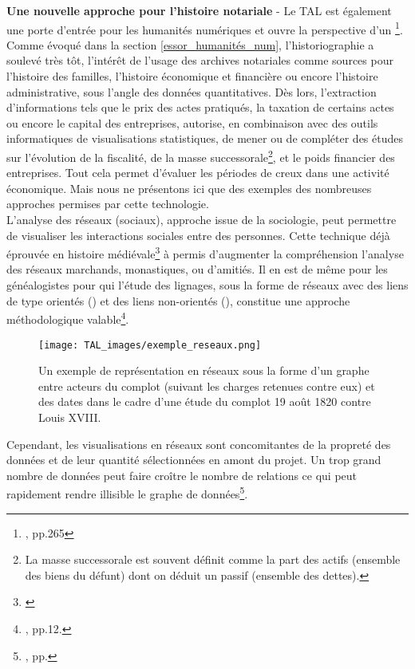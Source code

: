 \textbf{Une nouvelle approche pour l'histoire notariale} - Le TAL est également une porte d'entrée pour les humanités numériques et ouvre la perspective d'un \footnote{\cite{limon-bonnet_innovation_2019}, pp.265}. 
Comme évoqué dans la section \ref{essor_humanités_num}, l'historiographie a soulevé très tôt, l'intérêt de l'usage des archives notariales comme sources pour l'histoire des familles, l'histoire économique et financière ou encore l'histoire administrative, sous l'angle des données quantitatives.  
Dès lors, l'extraction d'informations tels que le prix des actes pratiqués, la taxation de certains actes ou encore le capital des entreprises, autorise, en combinaison avec des outils informatiques de visualisations statistiques, de mener ou de compléter des études sur l'évolution de la fiscalité, de la masse successorale\footnote{La masse successorale est souvent définit comme la part des actifs (ensemble des biens du défunt) dont on déduit un passif (ensemble des dettes).}, et le poids financier des entreprises. Tout cela permet d'évaluer les périodes de creux dans une activité économique. Mais nous ne présentons ici que des exemples des nombreuses approches permises par cette technologie.\\

L'analyse des réseaux (sociaux), approche issue de la sociologie, peut permettre de visualiser les interactions sociales entre des personnes. Cette technique déjà éprouvée en histoire médiévale\footnote{\cite{jegou_potentialites_nodate}} à permis d'augmenter la compréhension l'analyse des réseaux marchands, monastiques, ou d'amitiés. Il en est de même pour les généalogistes pour qui l'étude des lignages, sous la forme de réseaux avec des liens de type orientés () et des liens non-orientés (), constitue une approche méthodologique valable\footnote{\cite{beauguitte_analyse_2016}, pp.12.}.\\

\begin{figure}[h]
    \texttt{[image: TAL\_images/exemple\_reseaux.png]}
    \caption{Un exemple de représentation en réseaux sous la forme d'un graphe entre acteurs du complot (suivant les charges retenues contre eux) et des dates dans le cadre d'une étude du complot 19 août 1820 contre Louis XVIII. \textcopyright\cite{faraut_les_2015}}
    \label{fig:NER}
\end{figure}
\newpage

Cependant, les visualisations en réseaux sont concomitantes de la propreté des données et de leur quantité sélectionnées en amont du projet. Un trop grand nombre de données peut faire croître le nombre de relations ce qui peut rapidement rendre illisible le graphe de données\footnote{\cite{beauguitte_analyse_2016}, pp.}.\\

